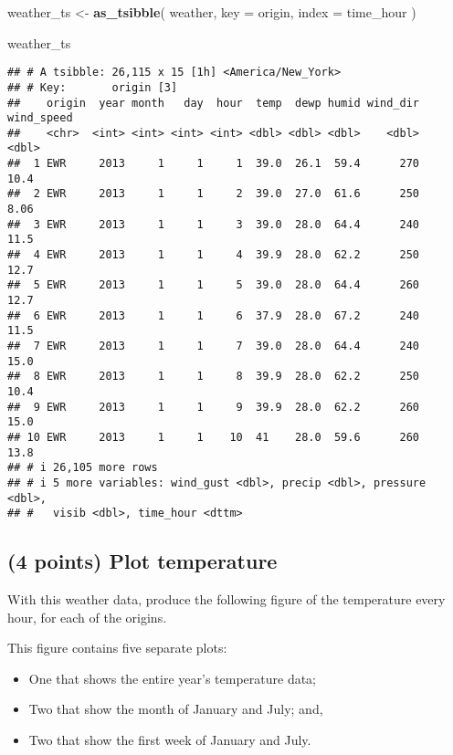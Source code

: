\documentclass[
]{article}
\newenvironment{Shaded}{\begin{snugshade}}{\end{snugshade}}
\newcommand{\AttributeTok}[1]{\textcolor[rgb]{0.13,0.29,0.53}{#1}}
\newcommand{\FunctionTok}[1]{\textcolor[rgb]{0.13,0.29,0.53}{\textbf{#1}}}
\newcommand{\NormalTok}[1]{#1}
\newcommand{\OtherTok}[1]{\textcolor[rgb]{0.56,0.35,0.01}{#1}}
\providecommand{\tightlist}{%
  \setlength{\itemsep}{0pt}\setlength{\parskip}{0pt}}
\begin{document}
\begin{Shaded}
\begin{Highlighting}[]
\NormalTok{weather\_ts }\OtherTok{\textless{}{-}} 
  \FunctionTok{as\_tsibble}\NormalTok{(}
\NormalTok{    weather,}
    \AttributeTok{key =}\NormalTok{ origin,}
    \AttributeTok{index =}\NormalTok{ time\_hour}
\NormalTok{  )}

\NormalTok{weather\_ts}
\end{Highlighting}
\end{Shaded}

\begin{verbatim}
## # A tsibble: 26,115 x 15 [1h] <America/New_York>
## # Key:       origin [3]
##    origin  year month   day  hour  temp  dewp humid wind_dir wind_speed
##    <chr>  <int> <int> <int> <int> <dbl> <dbl> <dbl>    <dbl>      <dbl>
##  1 EWR     2013     1     1     1  39.0  26.1  59.4      270      10.4 
##  2 EWR     2013     1     1     2  39.0  27.0  61.6      250       8.06
##  3 EWR     2013     1     1     3  39.0  28.0  64.4      240      11.5 
##  4 EWR     2013     1     1     4  39.9  28.0  62.2      250      12.7 
##  5 EWR     2013     1     1     5  39.0  28.0  64.4      260      12.7 
##  6 EWR     2013     1     1     6  37.9  28.0  67.2      240      11.5 
##  7 EWR     2013     1     1     7  39.0  28.0  64.4      240      15.0 
##  8 EWR     2013     1     1     8  39.9  28.0  62.2      250      10.4 
##  9 EWR     2013     1     1     9  39.9  28.0  62.2      260      15.0 
## 10 EWR     2013     1     1    10  41    28.0  59.6      260      13.8 
## # i 26,105 more rows
## # i 5 more variables: wind_gust <dbl>, precip <dbl>, pressure <dbl>,
## #   visib <dbl>, time_hour <dttm>
\end{verbatim}

\newline

\subsection{(4 points) Plot temperature}\label{points-plot-temperature}

With this weather data, produce the following figure of the temperature
every hour, for each of the origins.

This figure contains five separate plots:

\begin{itemize}
\tightlist
\item
  One that shows the entire year's temperature data;
\item
  Two that show the month of January and July; and,
\item
  Two that show the first week of January and July.
\end{itemize}
\end{document}

